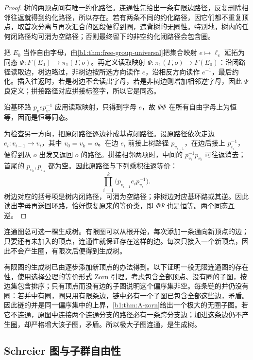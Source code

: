 \begin{proof}
	树的两顶点间有唯一约化路径。连通性先给出一条有限边路径，反复删除相邻往返就得到约化路径，所以存在。若有两条不同的约化路径，因它们都不重复顶点，取首次分离与再次汇合的区段便得到圈，违背树的无圈性。特别地，树内的任何闭路径均可消为空路径；否则最终留下的非空约化闭路径会包含圈。

	把 \(E_0\) 当作自由字母，由\cref{b1:thm:free-group-universal}把集合映射 \(e\mapsto\ell_e\) 延拓为同态 \(\Phi:F(E_0)\rightarrow\pi_1(\Gamma,o)\)。再定义读取映射 \(\Psi:\pi_1(\Gamma,o)\rightarrow F(E_0)\)：沿闭路径读取边，树边略过，非树边按所选方向读作 \(e\)，沿相反方向读作 \(e^{-1}\)，最后约化。插入往返时，若是树边不会读出字母，若是非树边则增加相邻逆字母，因此 \(\Psi\) 良定义；拼接路径对应拼接标签字，所以它是同态。

	沿基环路 \(p_v e p_w^{-1}\) 应用读取映射，只得到字母 \(e\)，故 \(\Psi\Phi\) 在所有自由字母上为恒等，因而是恒等同态。

	为检查另一方向，把原闭路径逐边补成基点闭路径。设原路径依次走边 \(e_i:v_{i-1}\rightarrow v_i\)，其中 \(v_0=v_k=o\)。在边 \(e_i\) 前接上树路径 \(p_{v_{i-1}}\)，在边后接上 \(p_{v_i}^{-1}\)，便得到从 \(o\) 出发又返回 \(o\) 的路径。拼接相邻两项时，中间的 \(p_{v_i}^{-1}p_{v_i}\) 可往返消去；首尾的 \(p_{v_0},p_{v_k}\) 都为空。因此原路径与下列乘积往返等价：
	\[
		\prod_{i=1}^k \bigl(p_{v_{i-1}}e_i p_{v_i}^{-1}\bigr).
	\]
	树边对应的括号项是树内闭路径，可消为空路径；非树边对应基环路或其逆。因此读出字母再送回环路，恰好恢复原来的等价类，即 \(\Phi\Psi\) 也是恒等。两个同态互逆。
\end{proof}

连通图总可选一棵生成树。有限图可以从根开始，每次添加一条通向新顶点的边；只要还有未加入的顶点，连通性就保证存在这样的边。每次只接入一个新顶点，因此不会产生圈，有限次后便得到生成树。

\ProseParagraphBreak
有限图的生成树已由逐步添加新顶点的办法得到。以下证明一般无限连通图的存在性，使用选择公理的等价形式 Zorn 引理。考虑包含全部顶点、没有圈的子图，按边集包含排序；只有顶点而没有边的子图说明这个偏序集非空。每条链的并仍没有圈：若并中有圈，圈只用有限条边，链中必有一个子图已包含全部这些边，矛盾。因此链的并是同一偏序集中的上界，\cref{b1:thm:A-zorn}给出一个极大的无圈子图。若它不连通，原图中连接两个连通分支的路径必有一条跨分支边；加进这条边仍不产生圈，却严格增大该子图，矛盾。所以极大子图连通，是生成树。

\subsection{Schreier 图与子群自由性}
\label{b1:subsec:0804:schreier-subgroup-freeness}

